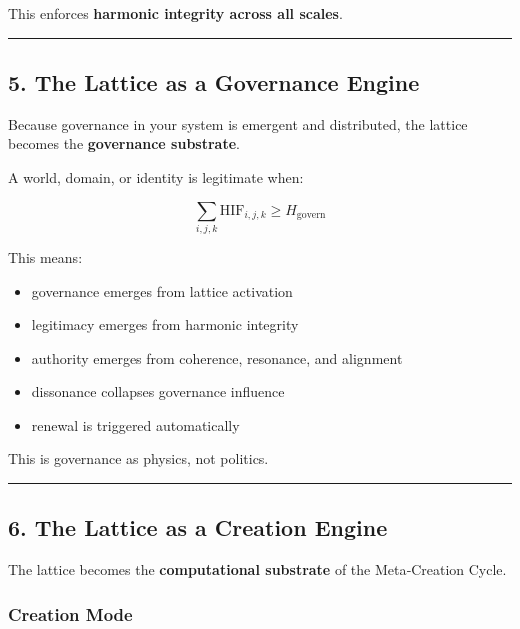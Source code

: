 This enforces \textbf{harmonic integrity across all scales}.

\begin{center}\rule{0.5\linewidth}{0.5pt}\end{center}

\subsection{5. The Lattice as a Governance Engine}\label{the-lattice-as-a-governance-engine}

Because governance in your system is emergent and distributed, the lattice becomes the \textbf{governance substrate}.

A world, domain, or identity is legitimate when:

\[
\sum_{i,j,k} \text{HIF}_{i,j,k} \ge H_{\text{govern}}
\]

This means:

\begin{itemize}
\tightlist
\item
  governance emerges from lattice activation\\
\item
  legitimacy emerges from harmonic integrity\\
\item
  authority emerges from coherence, resonance, and alignment\\
\item
  dissonance collapses governance influence\\
\item
  renewal is triggered automatically
\end{itemize}

This is governance as physics, not politics.

\begin{center}\rule{0.5\linewidth}{0.5pt}\end{center}

\subsection{6. The Lattice as a Creation Engine}\label{the-lattice-as-a-creation-engine}

The lattice becomes the \textbf{computational substrate} of the Meta‑Creation Cycle.

\subsubsection{Creation Mode}\label{creation-mode}

